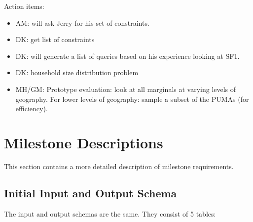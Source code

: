 \documentclass{amsart}
\begin{document}
{\vspace{3em}
Action items:
\begin{itemize}
\item AM: will ask Jerry for his set of constraints.  
\item DK: get list of constraints
\item DK: will generate a list of queries based on his experience looking at SF1.  
\item DK: household size distribution problem
\item MH/GM: Prototype evaluation: look at all marginals at varying levels of geography.  For lower levels of geography: sample a subset of the PUMAs (for efficiency).  
\end{itemize}

\section{Milestone Descriptions}\label{sec:milestonedesc}
This section contains a more detailed description of milestone requirements.

\subsection{Initial Input and Output Schema}\label{sec:milestone:schema}
The input and output schemas are the same. They consist of 5 tables:

}
\end{document}
